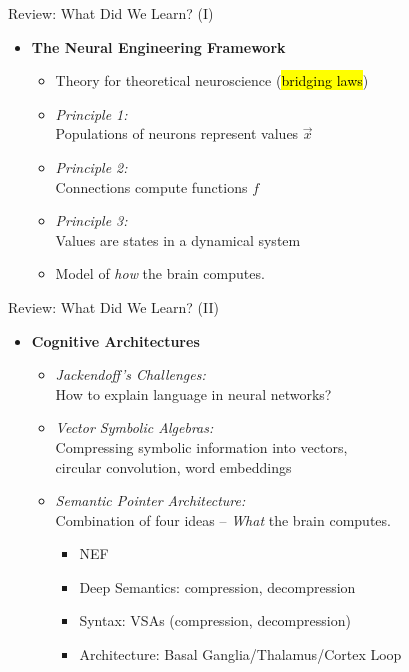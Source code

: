 \documentclass[handout,aspectratio=169]{beamer}
\begin{document}
\begin{frame}{Review: What Did We Learn? (I)}
	\begin{itemize}
		\item \textbf{The Neural Engineering Framework}\\[0.25cm]
		\begin{itemize}
			\setlength{\itemsep}{0.25cm}
			\item Theory for theoretical neuroscience (\hl{bridging laws})
			\item \emph{Principle 1:}\\Populations of neurons represent values $\vec x$
			\item \emph{Principle 2:}\\Connections compute functions $f$
			\item \emph{Principle 3:}\\Values are states in a dynamical system
			\item<2-> Model of \emph{how} the brain computes.   \only<5->{But hopefully useful!}
		\end{itemize}
	\end{itemize}
\end{frame}

\begin{frame}{Review: What Did We Learn? (II)}
	\begin{itemize}
		\item \textbf{Cognitive Architectures}\\[0.25cm]
		\begin{itemize}
			\setlength{\itemsep}{0.25cm}
			\item \emph{Jackendoff's Challenges:}\\
			How to explain language in neural networks?
			\item \emph{Vector Symbolic Algebras:}\\
			Compressing symbolic information into vectors,\\circular convolution, word embeddings
			\item \emph{Semantic Pointer Architecture:}\\
			Combination of four ideas -- \emph{What} the brain computes.
			\begin{itemize}
				\setlength{\itemsep}{0.125cm}
				\item NEF
				\item Deep Semantics: compression, decompression
				\item Syntax: VSAs (compression, decompression)
				\item Architecture: Basal Ganglia/Thalamus/Cortex Loop
			\end{itemize}
		\end{itemize}
	\end{itemize}
\end{frame}
\end{document}
